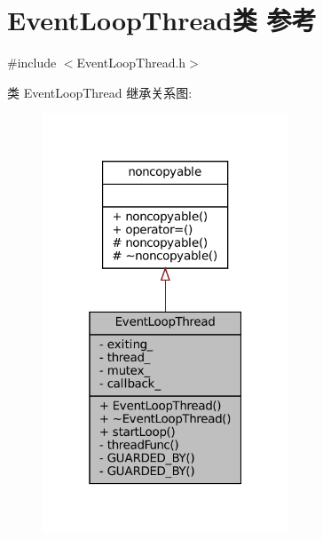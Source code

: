 \hypertarget{classmuduo_1_1net_1_1EventLoopThread}{}\section{Event\+Loop\+Thread类 参考}
\label{classmuduo_1_1net_1_1EventLoopThread}


{\ttfamily \#include $<$Event\+Loop\+Thread.\+h$>$}



类 Event\+Loop\+Thread 继承关系图\+:
\nopagebreak
\begin{figure}[H]
\begin{center}
\leavevmode
\includegraphics[width=208pt]{classmuduo_1_1net_1_1EventLoopThread__inherit__graph}
\end{center}
\end{figure}


